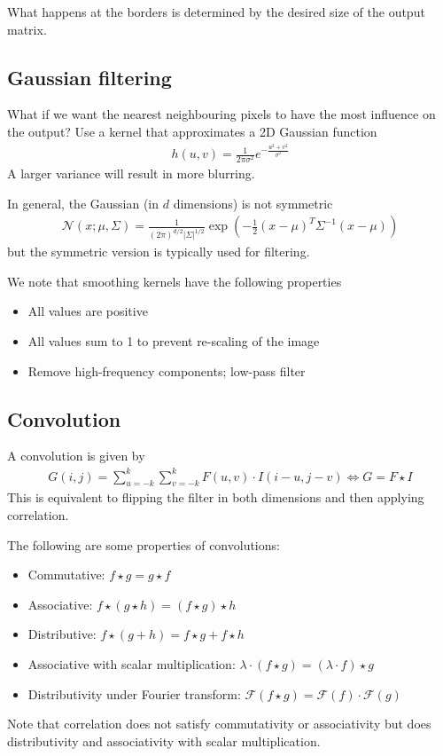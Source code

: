 \documentclass[11pt]{article}
\begin{document}
What happens at the borders is determined by the desired size of the output matrix. 

\subsection{Gaussian filtering}
What if we want the nearest neighbouring pixels to have the most influence on the output? Use a kernel that approximates a 2D Gaussian function 
\begin{align*}
    h(u,v) = \frac{1}{2\pi \sigma^2 } e^{-\frac{u^2 + v^2}{\sigma^2}}
\end{align*}
A larger variance will result in more blurring. 

In general, the Gaussian (in $d$ dimensions) is not symmetric 
\begin{align*}
    \mathcal{N}(x; \mu, \Sigma) = \frac{1}{(2\pi)^{d/2}|\Sigma|^{1/2}} \exp(-\frac{1}{2}(x - \mu)^T \Sigma^{-1}(x-\mu))
\end{align*}
but the symmetric version is typically used for filtering. 

We note that smoothing kernels have the following properties 
\begin{itemize}
    \item All values are positive
    \item All values sum to 1 to prevent re-scaling of the image 
    \item Remove high-frequency components; low-pass filter
\end{itemize}

\subsection{Convolution}
A convolution is given by 
\begin{align*}
    G(i,j) = \sum_{u = -k}^k \sum_{v = -k}^k F(u,v) \cdot I(i - u, j - v) \iff G = F \star I 
\end{align*}
This is equivalent to flipping the filter in both dimensions and then applying correlation. 

The following are some properties of convolutions: 
\begin{itemize}
    \item Commutative: $f \star g = g \star f$ 
    \item Associative: $f \star ( g \star h) = (f \star g) \star h$ 
    \item Distributive: $f \star (g + h) = f \star g + f \star h$
    \item Associative with scalar multiplication: $\lambda \cdot (f \star g) = (\lambda \cdot f) \star g$ 
    \item Distributivity under Fourier transform: $\mathcal{F}(f \star g) = \mathcal{F}(f) \cdot \mathcal{F}(g)$
\end{itemize}
Note that correlation does not satisfy commutativity or associativity but does distributivity and associativity with scalar multiplication. 
\end{document}
